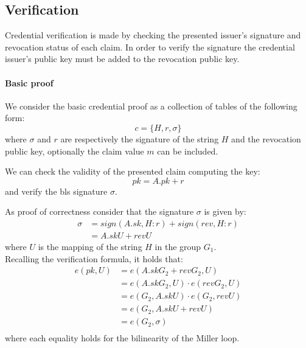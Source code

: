 \subsection{Verification}

Credential verification is made by checking the presented issuer's
signature and revocation status of each claim. In order to verify the
signature the credential issuer's public key must be added to the
revocation public key.

\paragraph{Basic proof}

We consider the basic credential proof as a collection of tables of
the following form:
\begin{equation*}
    c = \{H, r, \sigma \}
\end{equation*}
where $\sigma$ and $r$ are respectively the signature of the string
$H$ and the revocation public key, optionally the claim value $m$ can
be included.

We can check the validity of the presented claim computing the key:
\begin{equation*}
    pk = A.pk + r
\end{equation*}
and verify the bls signature $\sigma$.

As proof of correctness consider that the signature $\sigma$ is given
by:
\begin{equation*}
\begin{split}
    \sigma &= sign(A.sk, H:r) + sign(rev, H:r) \\
     &= A.sk U + rev U
\end{split}
\end{equation*}
where $U$ is the mapping of the string $H$ in the group $G_1$.\\
Recalling the verification formula, it holds that:
\begin{equation*}
\begin{split}
 e(pk, U) &= e(A.skG_2 + revG_2, U) \\
 &= e(A.skG_2, U) \cdot e(revG_2, U) \\
 &= e(G_2, A.sk U) \cdot e(G_2, rev U) \\
 &= e(G_2, A.sk U + rev U) \\
 &= e(G_2, \sigma) \\
\end{split}
\end{equation*}
where each equality holds for the bilinearity of the Miller loop.

